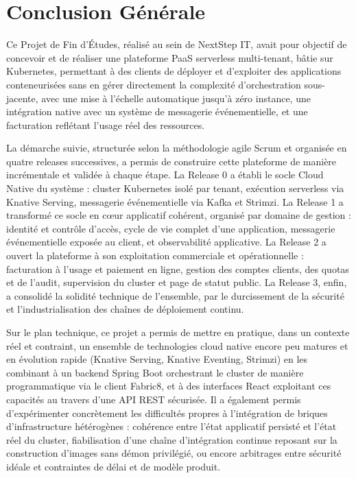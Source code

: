 \chapter*{Conclusion Générale}

Ce Projet de Fin d'Études, réalisé au sein de NextStep IT, avait pour objectif de concevoir et de réaliser une plateforme PaaS serverless multi-tenant, bâtie sur Kubernetes, permettant à des clients de déployer et d'exploiter des applications conteneurisées sans en gérer directement la complexité d'orchestration sous-jacente, avec une mise à l'échelle automatique jusqu'à zéro instance, une intégration native avec un système de messagerie événementielle, et une facturation reflétant l'usage réel des ressources.

La démarche suivie, structurée selon la méthodologie agile Scrum et organisée en quatre releases successives, a permis de construire cette plateforme de manière incrémentale et validée à chaque étape. La Release 0 a établi le socle Cloud Native du système : cluster Kubernetes isolé par tenant, exécution serverless via Knative Serving, messagerie événementielle via Kafka et Strimzi. La Release 1 a transformé ce socle en cœur applicatif cohérent, organisé par domaine de gestion : identité et contrôle d'accès, cycle de vie complet d'une application, messagerie événementielle exposée au client, et observabilité applicative. La Release 2 a ouvert la plateforme à son exploitation commerciale et opérationnelle : facturation à l'usage et paiement en ligne, gestion des comptes clients, des quotas et de l'audit, supervision du cluster et page de statut public. La Release 3, enfin, a consolidé la solidité technique de l'ensemble, par le durcissement de la sécurité et l'industrialisation des chaînes de déploiement continu.

Sur le plan technique, ce projet a permis de mettre en pratique, dans un contexte réel et contraint, un ensemble de technologies cloud native encore peu matures et en évolution rapide (Knative Serving, Knative Eventing, Strimzi) en les combinant à un backend Spring Boot orchestrant le cluster de manière programmatique via le client Fabric8, et à des interfaces React exploitant ces capacités au travers d'une API REST sécurisée. Il a également permis d'expérimenter concrètement les difficultés propres à l'intégration de briques d'infrastructure hétérogènes : cohérence entre l'état applicatif persisté et l'état réel du cluster, fiabilisation d'une chaîne d'intégration continue reposant sur la construction d'images sans démon privilégié, ou encore arbitrages entre sécurité idéale et contraintes de délai et de modèle produit.

